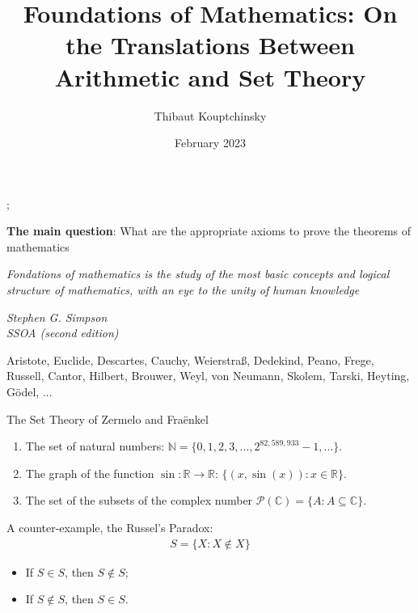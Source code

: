 \documentclass{beamer} %
\title[Arithmetic and Set Theory]{Foundations of Mathematics: On the Translations Between 
Arithmetic and Set Theory}
\institute[COLABS]{COLABS Tohoku University \and UCLouvain}
\author{Thibaut Kouptchinsky}
\date{February 2023}
\begin{document}
\begin{frame}
	\titlepage;
\end{frame}

\begin{frame}{\textbf{The main question}: What are the appropriate axioms to prove the theorems of mathematics }

        \epigraph{\textit{Fondations of mathematics is the study of the most basic concepts 
        and logical structure of mathematics, with an eye to the unity of human knowledge}}{\textit{Stephen G. Simpson \\ SSOA (second edition)}}
\pause Aristote, Euclide, Descartes, Cauchy, Weierstraß, Dedekind, Peano, Frege, Russell, 
Cantor, Hilbert, Brouwer, Weyl, von Neumann, Skolem, Tarski, Heyting, Gödel, $\dots$
\end{frame}

\begin{frame}{The Set Theory of Zermelo and Fraënkel}
    \begin{example}
         \begin{enumerate}
            \item<1-> The set of natural numbers: $\mathbb{N} = \{0, 1, 2, 3, \dots, 2^{82,589,933}-1, \dots \}$.
            \item<2-> The graph of the function $\sin \colon \mathbb{R} \to \mathbb{R}$: $\{(x,\sin(x)) : x \in \mathbb{R}\}$.
            \item<3-> The set of the subsets of the complex number $\mathcal{P}(\mathbb{C}) = \{A : A \subseteq \mathbb{C}\}$.
        \end{enumerate}
    \end{example}
    \pause 
    \pause 
    \pause 
    A counter-example, the Russel's Paradox: \begin{align*}
        S = \{ X : X \not\in X\}
    \end{align*}
    \begin{itemize}
        \item<5-> If $S \in S$, then $S \not\in S$;
        \item<6-> If $S \not\in S$, then $S \in S$. 
    \end{itemize}
\end{frame}
\end{document}
